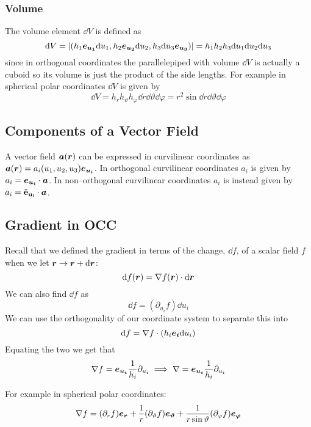 \documentclass{article}
\begin{document}
    \subsubsection{Volume}
    The volume element \(\dd V\) is defined as
    \[\dd V = |(h_1\bm{e_{u_1}}\dd u_1, h_2\bm{e_{u_2}}\dd u_2, h_3\dd u_3\bm{e_{u_3}})| = h_1h_2h_3\dd u_1\dd u_2\dd u_3\]
    since in orthogonal coordinates the parallelepiped with volume \(\dd V\) is actually a cuboid so its volume is just the product of the side lengths.
    For example in spherical polar coordinates \(\dd V\) is given by
    \[\dd V = h_rh_\vartheta h_\varphi\dd r\dd\vartheta\dd\varphi = r^2\sin\dd r\dd\vartheta\dd\varphi\]
    
    \subsection{Components of a Vector Field}
    A vector field \(\bm{a}(\bm{r})\) can be expressed in curvilinear coordinates as \(\bm{a}(\bm{r}) = a_i(u_1, u_2, u_3)\bm{e_{u_i}}\).
    In orthogonal curvilinear coordinates \(a_i\) is given by \(a_i = \bm{e_{u_i}}\cdot\bm{a}\).
    In non--orthogonal curvilinear coordinates \(a_i\) is instead given by \(a_i = \tilde{\mathbf{e}}_{\mathbf{u_i}}\cdot\bm{a}\).
    
    \subsection{Gradient in OCC}
    Recall that we defined the gradient in terms of the change, \(\dd f\), of a scalar field \(f\) when we let \(\bm{r} \to \bm{r} + \dd\bm{r}\):
    \[\dd f(\bm{r}) = \nabla f(\bm{r})\cdot\dd\bm{r}\]
    We can also find \(\dd f\) as
    \[\dd f = (\partial_{u_i} f)\dd u_i\]
    We can use the orthogonality of our coordinate system to separate this into
    \[\dd f = \nabla f\cdot(h_i\bm{e_{i}}\dd u_i)\]
    Equating the two we get that
    \[\nabla f = \bm{e_{u_i}}\frac{1}{h_i}\partial_{u_i}\implies \nabla = \bm{e_{u_i}}\frac{1}{h_i}\partial_{u_i}\]
    
    For example in spherical polar coordinates:
    \[\nabla f = (\partial_r f)\bm{e_{r}} + \frac{1}{r}(\partial_\vartheta f)\bm{e_{\vartheta}} + \frac{1}{r\sin\vartheta}(\partial_\varphi f)\bm{e_{\varphi}}\]
    
\end{document}
